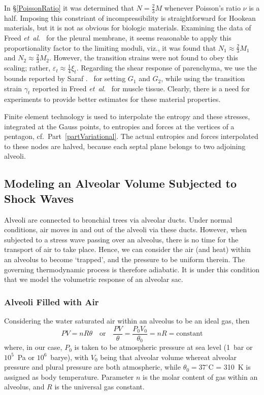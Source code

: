 In \S\ref{PoissonRatio} it was determined that $N = \tfrac{2}{3} M$ whenever Poisson's ratio $\nu$ is a half.  Imposing this constriant of incompressibility is straightforward for Hookean materials, but it is not as obvious for biologic materials.  Examining the data of Freed \textit{et~al}.\ \cite{Freedetal17} for the pleural membrane, it seems reasonable to apply this proportionality factor to the limiting moduli, viz., it was found that $N_1 \approx \tfrac{2}{3} M_1$ and $N_2 \approx \tfrac{2}{3} M_2$.  However, the transition strains were not found to obey this scaling; rather, $\varepsilon_t \approx \tfrac{1}{4} \xi_t$.  Regarding the shear response of parenchyma, we use the bounds reported by Saraf .\ \cite{Sarafetal07} for setting $G_1$ and $G_2$, while using the transition strain $\gamma_t$ reported in Freed \textit{et~al}.\ \cite{Freedetal17} for muscle tissue.  Clearly, there is a need for experiments to provide better estimates for these material properties.

Finite element technology is used to interpolate the entropy and these stresses, integrated at the Gauss points, to entropies and forces at the vertices of a pentagon, cf.\ Part~\ref{partVariational}.  The actual entropies and forces interpolated to these nodes are halved, because each septal plane belongs to two adjoining alveoli. 

\subsection{Modeling an Alveolar Volume Subjected to Shock Waves}
\label{sec:IdealGasLaw}

Alveoli are connected to bronchial trees via alveolar ducts.  Under normal conditions, air moves in and out of the alveoli via these ducts.  However, when subjected to a stress wave passing over an alveolus, there is no time for the transport of air to take place.  Hence, we can consider the air (and heat) within an alveolus to become `trapped', and the pressure to be uniform therein.  The governing thermo\-dynamic process is therefore adiabatic.  It is under this condition that we model the volumetric response of an alveolar sac.

\subsubsection{Alveoli Filled with Air}

Considering the water saturated air within an alveolus to be an ideal gas, then \cite{Davison08}
\begin{equation}
P V = n \! R \theta
\quad \text{or} \quad
\frac{P V}{\theta} = \frac{P_0 V_0}{\theta_0} = n \! R = \mathrm{constant}
\label{idealGas}
\end{equation}
where, in our case, $P_0$ is taken to be atmospheric pressure at sea level (1~bar or $10^5$~Pa or $10^6$~barye), with $V_0$ being that alveolar volume whereat alveolar pressure and plural pressure are both atmospheric, while $\theta_0 = 37^{\circ}$C = 310~K is assigned as body temperature.  Parameter $n$ is the molar content of gas within an alveolus, and $R$ is the universal gas constant.  

